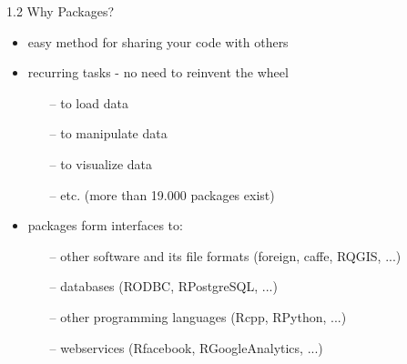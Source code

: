 \documentclass[11pt,a4paper]{beamer}
\begin{document}
	
	\begin{frame}[t]{1.2 Why Packages?}
		
	
		\begin{itemize}
			\item easy method for sharing your code with others 
			\item recurring tasks - no need to reinvent the wheel
			\begin{itemize}
				\item[--] to load data
				\item[--] to manipulate data
				\item[--] to visualize data
				\item[--] etc. (more than 19.000 packages exist)
			\end{itemize}
			\item packages form interfaces to:
			\begin{itemize}
				\item[--] other software and its file formats (foreign, caffe, RQGIS, ...)
				\item[--] databases (RODBC, RPostgreSQL, ...)
				\item[--] other programming languages (Rcpp, RPython, ...)
				\item[--] webservices (Rfacebook, RGoogleAnalytics, ...)
			\end{itemize}
		\end{itemize}
	
	\end{frame}




\end{document}

